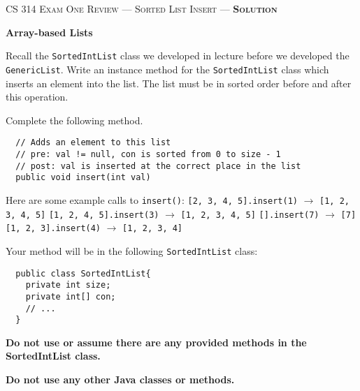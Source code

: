 \documentclass[12pt,letter]{article}
\begin{document}
\noindent\textsc{\large CS 314 Exam One Review --- Sorted List Insert --- \textbf{Solution}}

\vspace{6pt}
\noindent\textbf{Array-based Lists}

\vspace{2pt}
\noindent Recall the \texttt{SortedIntList} class we developed in lecture before we developed
the \texttt{GenericList}. Write an instance method for the \texttt{SortedIntList} class which inserts
an element into the list. The list must be in sorted order before and after this operation.

\vspace{4pt}
\noindent Complete the following method.
\begin{verbatim}
  // Adds an element to this list
  // pre: val != null, con is sorted from 0 to size - 1
  // post: val is inserted at the correct place in the list
  public void insert(int val)
\end{verbatim}

\vspace{4pt}

\noindent Here are some example calls to \texttt{insert()}:
\newline
\noindent \texttt{[2, 3, 4, 5].insert(1)} $\rightarrow$ \texttt{[1, 2, 3, 4, 5]}
\newline
\noindent \texttt{[1, 2, 4, 5].insert(3)} $\rightarrow$ \texttt{[1, 2, 3, 4, 5]}
\newline
\noindent \texttt{[].insert(7)} $\rightarrow$ \texttt{[7]}
\newline
\noindent \texttt{[1, 2, 3].insert(4)} $\rightarrow$ \texttt{[1, 2, 3, 4]}
\newline

\noindent Your method will be in the following \texttt{SortedIntList} class:

\begin{verbatim}
  public class SortedIntList{
    private int size;
    private int[] con;
    // ...
  }

\end{verbatim}

\noindent \textbf{Do not use or assume there are any provided methods in the SortedIntList class.}

\noindent \textbf{Do not use any other Java classes or methods.}
\end{document}
